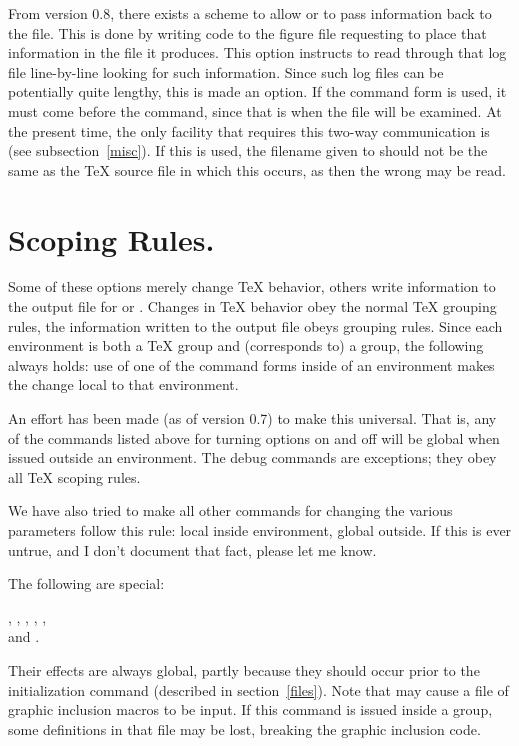 \documentclass[letterpaper]{article}
\begin{document}
From version 0.8, there exists a scheme to allow \MF{} or \MP{} to pass
information back to the  file. This is done by writing code
to the figure file requesting \MF{} to place that information in the
 file it produces. This option instructs \mfp{} to read
through that log file line-by-line looking for such information. Since
such log files can be potentially quite lengthy, this is made an option.
If the command form  is used, it must come before the
 command, since that is when the file will be
examined. At the present time, the only \mfp{} facility that requires
this two-way communication is  (see
subsection~\ref{misc}). If this is used, the filename given to
 should not be the same as the \TeX{} source file in
which this occurs, as then the wrong  may be read.


\section{Scoping Rules.}\label{scoping}

Some of these options merely change \TeX{} behavior, others write
information to the output file for \MF{} or \MP{}. Changes in \TeX{}
behavior obey the normal \TeX{} grouping rules, the information written
to the output file obeys \MF{} grouping rules. Since each 
environment is both a \TeX{} group and (corresponds to) a \MF{} group,
the following always holds: use of one of the command forms inside of an
 environment makes the change local to that environment.

An effort has been made (as of version 0.7) to make this universal. That
is, any of the commands listed above for turning options on and off will
be global when issued outside an  environment. The debug
commands are exceptions; they obey all \TeX{} scoping rules.

We have also tried to make all other \mfp{} commands for changing the
various parameters follow this rule: local inside 
environment, global outside. If this is ever untrue, and I don't
document that fact, please let me know.

The following are special:
\begin{display}
  ,
  ,
  ,
  ,
  ,\\
  and .
\end{display}
\noindent Their effects are always global, partly because they should
occur prior to the initialization command  (described
in section~\ref{files}). Note that  may cause a file of
graphic inclusion macros to be input. If this command is issued inside a
group, some definitions in that file may be lost, breaking the graphic
inclusion code.
\end{document}
